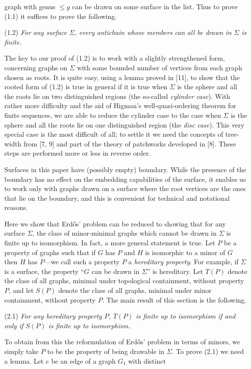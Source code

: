 \noindent graph with genus $\le g$ can be drawn on some surface in the list. Thus to prove (1.1) it suffices to prove the following.

\stmt
(1.2) \textit{For any surface $\Sigma$, every antichain whose members can all be drawn in $\Sigma$ is finite.}

The key to our proof of (1.2) is to work with a slightly strengthened form, concerning graphs on $\Sigma$ with some bounded number of vertices from each graph chosen as roots. It is quite easy, using a lemma proved in [11], to show that the rooted form of (1.2) is true in general if it is true when $\Sigma$ is the sphere and all the roots lie on two distinguished regions (the so-called \textit{cylinder case}). With rather more difficulty and the aid of Higman's well-quasi-ordering theorem for finite sequences, we are able to reduce the cylinder case to the case when $\Sigma$ is the sphere and all the roots lie on one distinguished region (the \textit{disc case}). This very special case is the most difficult of all; to settle it we need the concepts of tree-width from [7, 9] and part of the theory of patchworks developed in [8]. These steps are performed more or less in reverse order.

Surfaces in this paper have (possibly empty) boundary. While the presence of the boundary has no effect on the embedding capabilities of the surface, it enables us to work only with graphs drawn on a surface where the root vertices are the ones that lie on the boundary, and this is convenient for technical and notational reasons.


Here we show that Erd\H{o}s' problem can be reduced to showing that for any surface $\Sigma$, the class of minor-minimal graphs which cannot be drawn in $\Sigma$ is finite up to isomorphism. In fact, a more general statement is true. Let $P$ be a property of graphs such that if $G$ has $P$ and $H$ is isomorphic to a minor of $G$ then $H$ has $P$---we call such a property $P$ a \textit{hereditary property}. For example, if $\Sigma$ is a surface, the property ``$G$ can be drawn in $\Sigma$'' is hereditary. Let $T(P)$ denote the class of all graphs, minimal under topological containment, without property $P$, and let $S(P)$ denote the class of all graphs, minimal under minor containment, without property $P$. The main result of this section is the following.

\stmt
(2.1) \textit{For any hereditary property $P$, $T(P)$ is finite up to isomorphism if and only if $S(P)$ is finite up to isomorphism.}

To obtain from this the reformulation of Erd\H{o}s' problem in terms of minors, we simply take $P$ to be the property of being drawable in $\Sigma$. To prove (2.1) we need a lemma. Let $e$ be an edge of a graph $G_1$ with distinct
